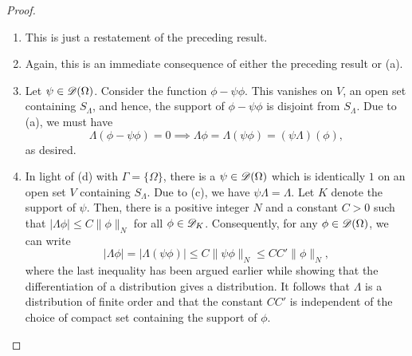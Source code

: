 \begin{proof}
\begin{enumerate}[label=(\alph*)]
    \item This is just a restatement of the preceding result. 
    \item Again, this is an immediate consequence of either the preceding result or (a). 
    \item Let $\psi\in\mathscr{D}(\Omega)$. Consider the function $\phi - \psi\phi$. This vanishes on $V$, an open set containing $S_\Lambda$, and hence, the support of $\phi - \psi\phi$ is disjoint from $S_\Lambda$. Due to (a), we must have 
    \begin{equation*}
        \Lambda\left(\phi - \psi\phi\right) = 0\implies\Lambda\phi = \Lambda(\psi\phi) = (\psi\Lambda)(\phi),
    \end{equation*}
    as desired. 
    \item In light of  (d) with $\Gamma = \{\Omega\}$, there is a $\psi\in\mathscr{D}(\Omega)$ which is identically $1$ on an open set $V$ containing $S_\Lambda$. Due to (c), we have $\psi\Lambda = \Lambda$. Let $K$ denote the support of $\psi$. Then, there is a positive integer $N$ and a constant $C > 0$ such that $|\Lambda\phi|\le C\|\phi\|_N$ for all $\phi\in\mathscr{D}_K$. Consequently, for any $\phi\in\mathscr{D}(\Omega)$, we  can write 
    \begin{equation*}
        |\Lambda\phi| = |\Lambda(\psi\phi)|\le C\|\psi\phi\|_N\le CC'\|\phi\|_N,
    \end{equation*}
    where the last inequality has been argued earlier while showing that the differentiation of a distribution gives a distribution. It follows that $\Lambda$ is a distribution of finite order and that the constant $CC'$ is independent of the choice of compact set containing the support of $\phi$.


\end{enumerate}
\end{proof}
